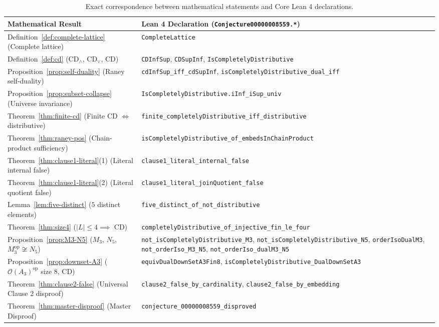 \documentclass[11pt,a4paper]{article}
\theoremstyle{plain}
\theoremstyle{definition}
\newcommand{\CDinf}{\mathrm{CD}_{\wedge}}
\newcommand{\CDsup}{\mathrm{CD}_{\vee}}
\newcommand{\op}{\mathrm{op}}
\newcommand{\Down}{\mathcal{O}}
\begin{document}
\begin{table}[htbp]
\centering
\footnotesize
\renewcommand{\arraystretch}{1.2}
\begin{tabular}{@{}>{\raggedright\arraybackslash}p{}>{\raggedright\arraybackslash}p{}@{}}
\toprule
\textbf{Mathematical Result} & \textbf{Lean 4 Declaration (\texttt{Conjecture00000008559.*})} \\
\midrule
Definition~\ref{def:complete-lattice} (Complete lattice) & \texttt{CompleteLattice} \\
Definition~\ref{def:cd} ($\CDinf$, $\CDsup$, CD) & \texttt{CDInfSup}, \texttt{CDSupInf}, \texttt{IsCompletelyDistributive} \\
Proposition~\ref{prop:self-duality} (Raney self-duality) & \texttt{cdInfSup\_iff\_cdSupInf}, \texttt{isCompletelyDistributive\_dual\_iff} \\
Proposition~\ref{prop:subset-collapse} (Universe invariance) & \texttt{IsCompletelyDistributive.iInf\_iSup\_univ} \\
Theorem~\ref{thm:finite-cd} (Finite CD $\iff$ distributive) & \texttt{finite\_completelyDistributive\_iff\_distributive} \\
Theorem~\ref{thm:raney-pos} (Chain-product sufficiency) & \texttt{isCompletelyDistributive\_of\_embedsInChainProduct} \\
Theorem~\ref{thm:clause1-literal}(1) (Literal internal false) & \texttt{clause1\_literal\_internal\_false} \\
Theorem~\ref{thm:clause1-literal}(2) (Literal quotient false) & \texttt{clause1\_literal\_joinQuotient\_false} \\
Lemma~\ref{lem:five-distinct} ($5$ distinct elements) & \texttt{five\_distinct\_of\_not\_distributive} \\
Theorem~\ref{thm:size4} ($|L| \le 4 \implies$ CD) & \texttt{completelyDistributive\_of\_injective\_fin\_le\_four} \\
Proposition~\ref{prop:M3-N5} ($M_3$, $N_5$, $M_3^{\op} \not\cong N_5$) & \texttt{not\_isCompletelyDistributive\_M3}, \texttt{not\_isCompletelyDistributive\_N5}, \texttt{orderIsoDualM3}, \texttt{not\_orderIso\_M3\_N5}, \texttt{not\_orderIso\_dualM3\_N5} \\
Proposition~\ref{prop:downset-A3} ($\Down(A_3)^{\op}$ size $8$, CD) & \texttt{equivDualDownSetA3Fin8}, \texttt{isCompletelyDistributive\_DualDownSetA3} \\
Theorem~\ref{thm:clause2-false} (Universal Clause 2 disproof) & \texttt{clause2\_false\_by\_cardinality}, \texttt{clause2\_false\_by\_embedding} \\
Theorem~\ref{thm:master-disproof} (Master Disproof) & \texttt{conjecture\_00000008559\_disproved} \\
\bottomrule
\end{tabular}
\caption{Exact correspondence between mathematical statements and Core Lean 4 declarations.}
\label{tab:lean-map}
\end{table}
\end{document}
